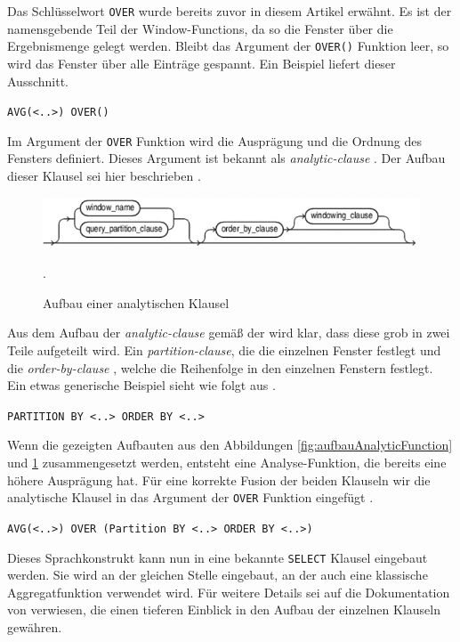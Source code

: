Das Schlüsselwort \texttt{OVER} wurde bereits zuvor in diesem Artikel erwähnt. Es
ist der namensgebende Teil der Window-Functions, da so die Fenster über die
Ergebnismenge gelegt werden. Bleibt das Argument der \texttt{OVER()} Funktion
leer, so wird das Fenster über alle Einträge gespannt. Ein Beispiel liefert
dieser Ausschnitt.
\begin{center}
	\texttt{AVG(<..>) OVER()} \citep[vgl.]{Nuijten2023}
\end{center}
Im Argument der \texttt{OVER} Funktion wird die Ausprägung und die Ordnung des
Fensters definiert. Dieses Argument ist bekannt als \textit{analytic-clause}
\citep[vgl.]{oracle}. Der Aufbau dieser Klausel sei hier beschrieben \citep[vgl.]{oracle}.
\begin{figure}[h]
	\centering
	\includegraphics[scale=0.5]{img/aufbauAnalyticClausel.jpg}
	\caption{ Aufbau einer analytischen Klausel \citep[vgl.][]{oracle}}
	. \label{fig:aufbauAnalytischeKlausel}
\end{figure}
Aus dem Aufbau der \textit{analytic-clause} gemäß der \citet{oracle} wird klar, dass
diese grob in zwei Teile aufgeteilt wird. Ein \textit{partition-clause}, die die
einzelnen Fenster festlegt und die \textit{order-by-clause} , welche die Reihenfolge
in den einzelnen Fenstern festlegt. Ein etwas generische Beispiel sieht wie
folgt aus \citep[vgl.]{oracle}.
\begin{center}
	\texttt{PARTITION BY <..> ORDER BY <..>} \\ \citep[vgl.][Analytic Functions]{Nuijten2023}
\end{center}
Wenn die gezeigten Aufbauten aus den Abbildungen \ref{fig:aufbauAnalyticFunction}
und \ref{fig:aufbauAnalytischeKlausel} zusammengesetzt werden, entsteht eine
Analyse-Funktion, die bereits eine höhere Ausprägung hat. Für eine korrekte
Fusion der beiden Klauseln wir die analytische Klausel in das Argument der
\texttt{OVER} Funktion eingefügt \citep[vgl.][Analytic Functions]{Nuijten2023}.
\begin{center}
	\texttt{AVG(<..>) OVER (Partition BY <..> ORDER BY <..>)} \\ \citep[vgl.][Analytic
	Functions]{Nuijten2023}
\end{center}
Dieses Sprachkonstrukt kann nun in eine bekannte \texttt{SELECT} Klausel
eingebaut werden. Sie wird an der gleichen Stelle eingebaut, an der auch eine
klassische Aggregatfunktion verwendet wird. Für weitere Details sei auf die Dokumentation
von \citet{oracle} verwiesen, die einen tieferen Einblick in den Aufbau der einzelnen
Klauseln gewähren.

